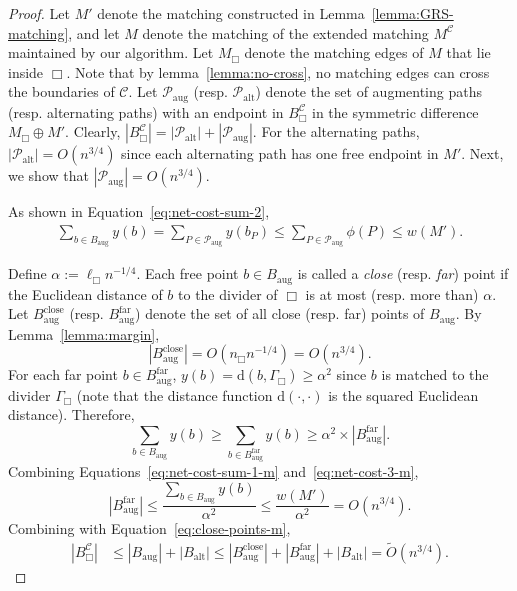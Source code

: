 \documentclass[11pt,onecolumn]{article}
\def\mcC{{\mathcal{C}}}
\def\mcP{{\mathcal{P}}}
\newcommand{\cell}{\Box}
\newcommand{\distance}[2]{\mathrm{d}(#1, #2)}
\newcommand{\divider}[1]{\Gamma_{#1}}
\begin{document}
\GRSIters*
\begin{proof}
Let $M'$ denote the matching constructed in Lemma~\ref{lemma:GRS-matching}, and let $M$ denote the matching of the extended matching $M^\mcC$ maintained by our algorithm. Let $M_\cell$ denote the matching edges of $M$ that lie inside $\cell$. Note that by lemma~\ref{lemma:no-cross}, no matching edges can cross the boundaries of $\mcC$.
Let $\mcP_{\mathrm{aug}}$ (resp. $\mcP_{\mathrm{alt}}$) denote the set of augmenting paths (resp. alternating paths) with an endpoint in $B_\cell^\mcC$ in the symmetric difference $M_\cell\oplus M'$. Clearly, $|B_\cell^\mcC|=|\mcP_{\mathrm{alt}}| + |\mcP_{\mathrm{aug}}|$. For the alternating paths, $|\mcP_{\mathrm{alt}}|=O(n^{3/4})$ since each alternating path has one free endpoint in $M'$. 
Next, we show that $|\mcP_{\mathrm{aug}}|=O(n^{3/4})$.

As shown in Equation~\eqref{eq:net-cost-sum-2},
\begin{align}
    \sum_{b\in B_{\mathrm{aug}}} y(b) = \sum_{P\in \mcP_{\mathrm{aug}}} y(b_P)\le \sum_{P\in \mcP_{\mathrm{aug}}} \phi(P) \le w(M').\label{eq:net-cost-sum-1-m}
\end{align}

Define $\alpha:=\ell_\cell n^{-1/4}$. Each free point $b\in B_{\mathrm{aug}}$ is called a \emph{close} (resp. \emph{far}) point if the Euclidean distance of $b$ to the divider of $\cell$ is at most (resp. more than) $\alpha$. Let $B_{\mathrm{aug}}^{\mathrm{close}}$ (resp. $B_{\mathrm{aug}}^{\mathrm{far}}$) denote the set of all close (resp. far) points of $B_{\mathrm{aug}}$. By Lemma~\ref{lemma:margin},
\begin{equation}\label{eq:close-points-m}
    |B_{\mathrm{aug}}^{\mathrm{close}}| = O(n_\cell n^{-1/4}) = O(n^{3/4}).
\end{equation}
For each far point $b\in B_{\mathrm{aug}}^{\mathrm{far}}$, $y(b)=\distance{b}{\divider\cell}\ge \alpha^2$ since $b$ is matched to the divider $\divider\cell$ (note that the distance function $\distance{\cdot}{\cdot}$ is the squared Euclidean distance). Therefore, 
\begin{equation}\label{eq:net-cost-3-m}
    \sum_{b\in B_{\mathrm{aug}}} y(b) \ge \sum_{b\in B_{\mathrm{aug}}^{\mathrm{far}}} y(b) \ge \alpha^2\times |B_{\mathrm{aug}}^{\mathrm{far}}|.
\end{equation}
Combining Equations~\eqref{eq:net-cost-sum-1-m} and~\eqref{eq:net-cost-3-m},
\begin{equation}\label{eq:far-points-m}
    |B_{\mathrm{aug}}^{\mathrm{far}}| \le \frac{\sum_{b\in B_{\mathrm{aug}}} y(b)}{\alpha^2} \le \frac{w(M')}{\alpha^2} = O(n^{3/4}).
\end{equation}
Combining with Equation~\eqref{eq:close-points-m},
\begin{align*}
    |B_\cell^\mcC| &\le |B_{\mathrm{aug}}| + |B_{\mathrm{alt}}| \le |B_{\mathrm{aug}}^{\mathrm{close}}| + |B_{\mathrm{aug}}^{\mathrm{far}}| + |B_{\mathrm{alt}}| = \tilde{O}(n^{3/4}).
\end{align*}
\end{proof}
\end{document}
